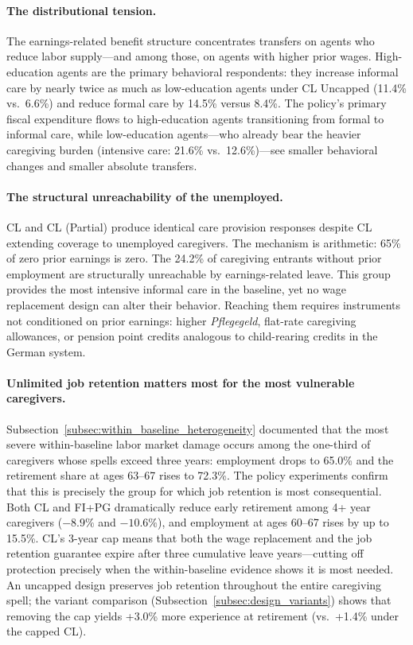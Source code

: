 \paragraph{The distributional tension.}

The earnings-related benefit structure concentrates transfers on agents who reduce labor supply---and among those, on agents with higher prior wages. High-education agents are the primary behavioral respondents: they increase informal care by nearly twice as much as low-education agents under CL Uncapped (11.4\% vs.\ 6.6\%) and reduce formal care by 14.5\% versus 8.4\%. The policy's primary fiscal expenditure flows to high-education agents transitioning from formal to informal care, while low-education agents---who already bear the heavier caregiving burden (intensive care: 21.6\% vs.\ 12.6\%)---see smaller behavioral changes and smaller absolute transfers.

\paragraph{The structural unreachability of the unemployed.}

CL and CL (Partial) produce identical care provision responses despite CL extending coverage to unemployed caregivers. The mechanism is arithmetic: 65\% of zero prior earnings is zero. The 24.2\% of caregiving entrants without prior employment are structurally unreachable by earnings-related leave. This group provides the most intensive informal care in the baseline, yet no wage replacement design can alter their behavior. Reaching them requires instruments not conditioned on prior earnings: higher \textit{Pflegegeld}, flat-rate caregiving allowances, or pension point credits analogous to child-rearing credits in the German system.

\paragraph{Unlimited job retention matters most for the most vulnerable caregivers.}

Subsection~\ref{subsec:within_baseline_heterogeneity} documented that the most severe within-baseline labor market damage occurs among the one-third of caregivers whose spells exceed three years: employment drops to 65.0\% and the retirement share at ages 63--67 rises to 72.3\%. The policy experiments confirm that this is precisely the group for which job retention is most consequential. Both CL and FI+PG dramatically reduce early retirement among 4+ year caregivers ($-8.9\%$ and $-10.6\%$), and employment at ages 60--67 rises by up to 15.5\%. CL's 3-year cap means that both the wage replacement and the job retention guarantee expire after three cumulative leave years---cutting off protection precisely when the within-baseline evidence shows it is most needed. An uncapped design preserves job retention throughout the entire caregiving spell; the variant comparison (Subsection~\ref{subsec:design_variants}) shows that removing the cap yields +3.0\% more experience at retirement (vs.\ +1.4\% under the capped CL).

